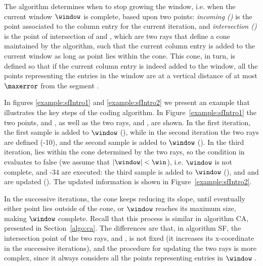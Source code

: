 

\vspace{-5pt}



The algorithm determines when to stop growing the window, i.e. when the current window $\window$ is complete, based upon two points: \textit{incoming (\incoming)} is the point associated to the column entry for the current iteration, and \textit{intersection (\intersection)} is the point of intersection of \smin and \smax, which are two rays that define a cone maintained by the algorithm, such that the current column entry is added to the current window as long as point \incoming lies within the cone. This cone, in turn, is defined so that if the current column entry is indeed added to the window, all the points representing the entries in the window are at a vertical distance of at most $\maxerror$ from the segment \interSegmentSF.


In figures \ref{example:sfIntro1} and \ref{example:sfIntro2} we present an example that illustrates the key steps of the coding algorithm. In Figure~\ref{example:sfIntro1} the two points, \incoming and \intersection, as well as the two rays, \smin and \smax, are shown. In the first iteration, the first sample is added to $\window$ (), while in the second iteration the two rays are defined (-10), and the second sample is added to $\window$ (). In the third iteration, \incoming lies within the cone determined by the two rays, so the condition in  evaluates to false (we assume that $|\window|<\win$), i.e. $\window$ is not complete, and -34 are executed: the third sample is added to $\window$ (), and \smin and \smax are updated (). The updated information is shown in Figure~\ref{example:sfIntro2}.


\vspace{+5pt}
\exampleSF


\clearpage


In the successive iterations, the cone keeps reducing its slope, until eventually either point \incoming lies outside of the cone, or $\window$ reaches its maximum size, making $\window$ complete. Recall that this process is similar in algorithm CA, presented in Section~\ref{algo:ca}. The differences are that, in algorithm SF, the intersection point of the two rays, \smin and \smax, is not fixed (it increases its x-coordinate in the successive iterations), and the procedure for updating the two rays is more complex, since it always considers all the points representing entries in $\window$ \cite{coder:sf}.


